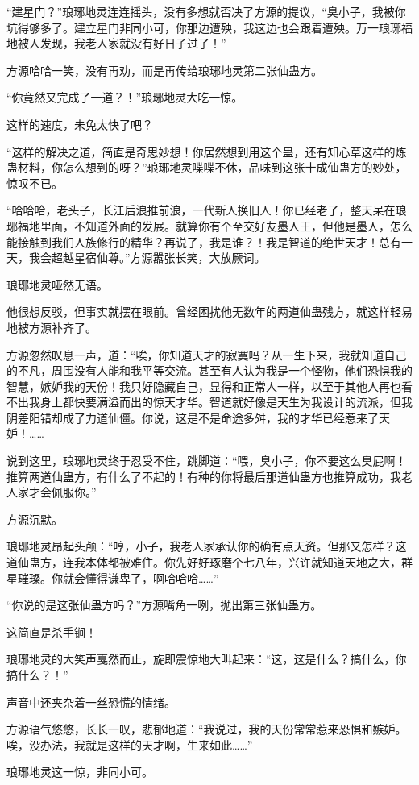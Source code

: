 \begin{this_body}
“建星门？”琅琊地灵连连摇头，没有多想就否决了方源的提议，“臭小子，我被你坑得够多了。建立星门非同小可，你那边遭殃，我这边也会跟着遭殃。万一琅琊福地被人发现，我老人家就没有好日子过了！”

方源哈哈一笑，没有再劝，而是再传给琅琊地灵第二张仙蛊方。

“你竟然又完成了一道？！”琅琊地灵大吃一惊。

这样的速度，未免太快了吧？

“这样的解决之道，简直是奇思妙想！你居然想到用这个蛊，还有知心草这样的炼蛊材料，你怎么想到的呀？”琅琊地灵喋喋不休，品味到这张十成仙蛊方的妙处，惊叹不已。

“哈哈哈，老头子，长江后浪推前浪，一代新人换旧人！你已经老了，整天呆在琅琊福地里面，不知道外面的发展。就算你有个至交好友墨人王，但他是墨人，怎么能接触到我们人族修行的精华？再说了，我是谁？！我是智道的绝世天才！总有一天，我会超越星宿仙尊。”方源嚣张长笑，大放厥词。

琅琊地灵哑然无语。

他很想反驳，但事实就摆在眼前。曾经困扰他无数年的两道仙蛊残方，就这样轻易地被方源补齐了。

方源忽然叹息一声，道：“唉，你知道天才的寂寞吗？从一生下来，我就知道自己的不凡，周围没有人能和我平等交流。甚至有人认为我是一个怪物，他们恐惧我的智慧，嫉妒我的天份！我只好隐藏自己，显得和正常人一样，以至于其他人再也看不出我身上都快要满溢而出的惊天才华。智道就好像是天生为我设计的流派，但我阴差阳错却成了力道仙僵。你说，这是不是命途多舛，我的才华已经惹来了天妒！……

说到这里，琅琊地灵终于忍受不住，跳脚道：“喂，臭小子，你不要这么臭屁啊！推算两道仙蛊方，有什么了不起的！有种的你将最后那道仙蛊方也推算成功，我老人家才会佩服你。”

方源沉默。

琅琊地灵昂起头颅：“哼，小子，我老人家承认你的确有点天资。但那又怎样？这道仙蛊方，连我本体都被难住。你先好好琢磨个七八年，兴许就知道天地之大，群星璀璨。你就会懂得谦卑了，啊哈哈哈……”

“你说的是这张仙蛊方吗？”方源嘴角一咧，抛出第三张仙蛊方。

这简直是杀手锏！

琅琊地灵的大笑声戛然而止，旋即震惊地大叫起来：“这，这是什么？搞什么，你搞什么？！”

声音中还夹杂着一丝恐慌的情绪。

方源语气悠悠，长长一叹，悲郁地道：“我说过，我的天份常常惹来恐惧和嫉妒。唉，没办法，我就是这样的天才啊，生来如此……”

琅琊地灵这一惊，非同小可。


\end{this_body}
